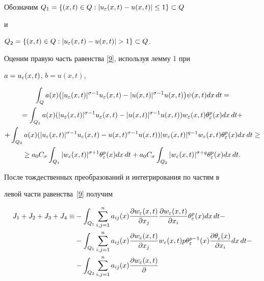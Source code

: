 \begin{pf}
Обозначим $Q_1=\{(x,t)\in Q:|u_\varepsilon(x,t)-u(x,t)|\le 1 \}\subset Q$


и


$Q_2=\{(x,t)\in Q:\linebreak |u_\eps(x,t)-u(x,t)|> 1 \}\subset Q$.





Оценим правую часть равенства \eqref{9}, используя лемму 1 при


$a=u_\varepsilon(x,t)$, $b=u(x,t)$,


\begin{multline}


\label{10}


\int_{Q}a(x)\big(|u_\eps(x,t)|^{\sigma-1}u_\eps(x,t)-


|u(x,t)|^{\sigma-1}u(x,t)\big)\psi(x,t) dx\,dt =\\


=\int_{Q_1}a(x)(|u_\eps(x,t)|^{\sigma-1}u_\eps(x,t)-|u(x,t)|^{\sigma-1}u(x,t))


w_\eps(x,t)\tmp dx\,dt + \\


+\int_{Q_2}a(x)(|u_\eps(x,t)|^{\sigma-1}u_\eps(x,t)-u(x,t)^{\sigma-1}u(x,t))


|w_\eps(x,t)|^{q-1}w_\eps(x,t)\tmp dx\,dt \ge \\ 


\ge a_0C_\sigma\int_{Q_1}|w_\eps(x,t)|^{\sigma+1}\tmp dx\,dt


+a_0C_\sigma\int_{Q_2} |w_\eps(x,t)|^{\sigma+q}\tmp dx\,dt.


\end{multline}


После тождественных преобразований и интегрирования по частям в


левой части равенства~\eqref{9} получим


\begin{align}


J_1+J_2+J_3+J_4 \equiv &-\int_{Q_1}\stdsum a_{ij}(x)\frac


{\dd w_\eps(x,t)}{\dd x_j}\frac{\dd w_\eps(x,t)}{\dd x_i}\tmp dx\,dt -\notag \\


&-\int_{Q_1}\stdsum a_{ij}(x)\frac {\dd w_\eps(x,t)}{\dd


x_j}w_\eps(x,t)p\theta_\eps^{p-1}(x)\frac{\dd \tm}{\dd x_i} dx\,dt -\notag \\


&-\int_{Q_2}\stdsum a_{ij}(x) \frac {\dd w_\eps(x,t)}{\dd


}
\end{align}
\end{pf}
